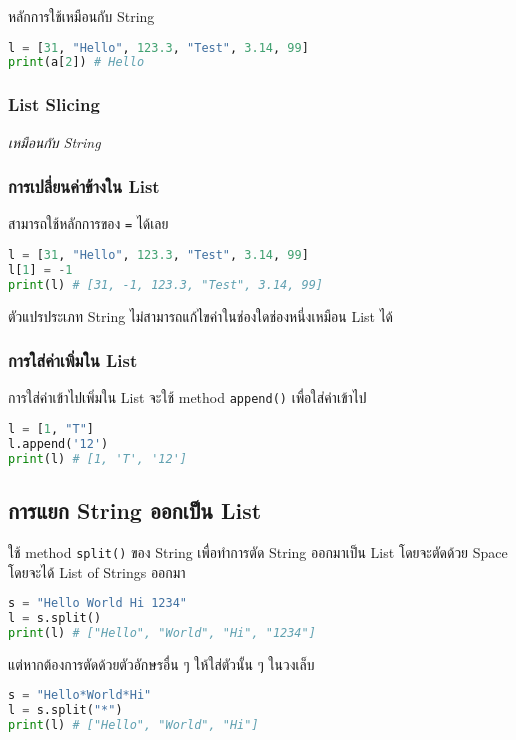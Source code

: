 หลักการใช้เหมือนกับ String

\begin{lstlisting}[language=Python]
l = [31, "Hello", 123.3, "Test", 3.14, 99]
print(a[2]) # Hello
\end{lstlisting}

\subsubsection{List Slicing}

\textit{เหมือนกับ String}

\subsubsection{การเปลี่ยนค่าข้างใน List}

สามารถใช้หลักการของ \verb|=| ได้เลย

\begin{lstlisting}[language=Python]
l = [31, "Hello", 123.3, "Test", 3.14, 99]
l[1] = -1
print(l) # [31, -1, 123.3, "Test", 3.14, 99]
\end{lstlisting}

\begin{remark}
    ตัวแปรประเภท String ไม่สามารถแก้ไขค่าในช่องใดช่องหนี่งเหมือน List ได้
\end{remark}

\subsubsection{การใส่ค่าเพิ่มใน List}

การใส่ค่าเข้าไปเพิ่มใน List จะใช้ method \verb|append()| เพื่อใส่ค่าเข้าไป

\begin{lstlisting}[language=Python]
l = [1, "T"]
l.append('12')
print(l) # [1, 'T', '12']
\end{lstlisting}

\subsection{การแยก String ออกเป็น List}

ใช้ method \verb|split()| ของ String เพื่อทำการตัด String ออกมาเป็น List โดยจะตัดด้วย Space โดยจะได้ List of Strings ออกมา

\begin{lstlisting}[language=Python]
s = "Hello World Hi 1234"
l = s.split()
print(l) # ["Hello", "World", "Hi", "1234"]
\end{lstlisting}

แต่หากต้องการตัดด้วยตัวอักษรอื่น ๆ ให้ใส่ตัวนั้น ๆ ในวงเล็บ

\begin{lstlisting}[language=Python]
s = "Hello*World*Hi"
l = s.split("*")
print(l) # ["Hello", "World", "Hi"]
\end{lstlisting}